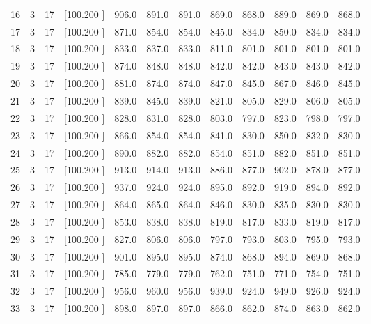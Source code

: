 \documentclass[12pt,a4paper]{article}
\begin{document}
\begin{center}
{\begin{tabular}{r r r r r r r r r r r r}
  16&  3& 17&[100.200   ]&   906.0&   891.0&   891.0&   869.0&   868.0&   889.0&   869.0&   868.0\\[-0.02in]
  17&  3& 17&[100.200   ]&   871.0&   854.0&   854.0&   845.0&   834.0&   850.0&   834.0&   834.0\\[-0.02in]
  18&  3& 17&[100.200   ]&   833.0&   837.0&   833.0&   811.0&   801.0&   801.0&   801.0&   801.0\\[-0.02in]
  19&  3& 17&[100.200   ]&   874.0&   848.0&   848.0&   842.0&   842.0&   843.0&   843.0&   842.0\\[-0.02in]
  20&  3& 17&[100.200   ]&   881.0&   874.0&   874.0&   847.0&   845.0&   867.0&   846.0&   845.0\\[-0.02in]
  21&  3& 17&[100.200   ]&   839.0&   845.0&   839.0&   821.0&   805.0&   829.0&   806.0&   805.0\\[-0.02in]
  22&  3& 17&[100.200   ]&   828.0&   831.0&   828.0&   803.0&   797.0&   823.0&   798.0&   797.0\\[-0.02in]
  23&  3& 17&[100.200   ]&   866.0&   854.0&   854.0&   841.0&   830.0&   850.0&   832.0&   830.0\\[-0.02in]
  24&  3& 17&[100.200   ]&   890.0&   882.0&   882.0&   854.0&   851.0&   882.0&   851.0&   851.0\\[-0.02in]
  25&  3& 17&[100.200   ]&   913.0&   914.0&   913.0&   886.0&   877.0&   902.0&   878.0&   877.0\\[-0.02in]
  26&  3& 17&[100.200   ]&   937.0&   924.0&   924.0&   895.0&   892.0&   919.0&   894.0&   892.0\\[-0.02in]
  27&  3& 17&[100.200   ]&   864.0&   865.0&   864.0&   846.0&   830.0&   835.0&   830.0&   830.0\\[-0.02in]
  28&  3& 17&[100.200   ]&   853.0&   838.0&   838.0&   819.0&   817.0&   833.0&   819.0&   817.0\\[-0.02in]
  29&  3& 17&[100.200   ]&   827.0&   806.0&   806.0&   797.0&   793.0&   803.0&   795.0&   793.0\\[-0.02in]
  30&  3& 17&[100.200   ]&   901.0&   895.0&   895.0&   874.0&   868.0&   894.0&   869.0&   868.0\\[-0.02in]
  31&  3& 17&[100.200   ]&   785.0&   779.0&   779.0&   762.0&   751.0&   771.0&   754.0&   751.0\\[-0.02in]
  32&  3& 17&[100.200   ]&   956.0&   960.0&   956.0&   939.0&   924.0&   949.0&   926.0&   924.0\\[-0.02in]
  33&  3& 17&[100.200   ]&   898.0&   897.0&   897.0&   866.0&   862.0&   874.0&   863.0&   862.0\\[-0.02in]

\end{tabular}}
\end{center}
\end{document}
